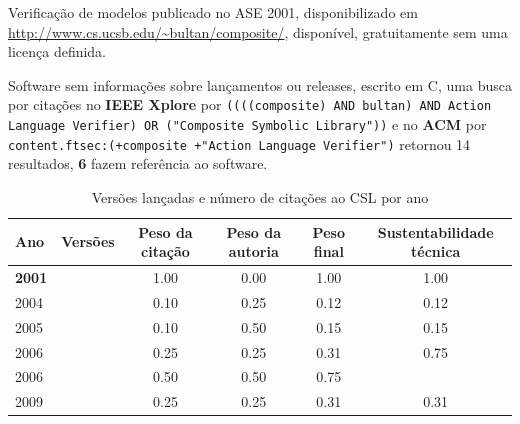 Verificação de modelos
publicado no ASE 2001,
disponibilizado em \url{http://www.cs.ucsb.edu/~bultan/composite/},
disponível,
gratuitamente
sem uma licença definida.

Software sem informações sobre lançamentos ou releases,
escrito em C,
uma busca por citações no {\bf IEEE Xplore} por
\texttt{((((composite) AND bultan) AND Action Language Verifier) OR ("Composite Symbolic Library"))}
e no {\bf ACM} por
\texttt{content.ftsec:(+composite +"Action Language Verifier")}
retornou
14 resultados,
{\bf 6} fazem referência ao software.


\begin{table}[H]
\caption{Versões lançadas e número de citações ao CSL por ano}
\centering
\begin{tabular}{| l | c | c | c | c | c |}
  \hline
  Ano & Versões & Peso da citação & Peso da autoria & Peso final & Sustentabilidade técnica \\
  \hline
            {\bf 2001}
          &
          
          &
          1.00
          &
          0.00
          &
          1.00
          &
            {\color{blue} 1.00}
          \\
\hline
            2004
          &
          
          &
          0.10
          &
          0.25
          &
          0.12
          &
            {\color{red} 0.12}
          \\
\hline
            2005
          &
          
          &
          0.10
          &
          0.50
          &
          0.15
          &
            {\color{red} 0.15}
          \\
\hline
            2006
          &
          
          &
          0.25
          &
          0.25
          &
          0.31
          &
            {\color{blue} 0.75}
          \\
            2006
          &
          
          &
          0.50
          &
          0.50
          &
          0.75
          &
          \\
\hline
            2009
          &
          
          &
          0.25
          &
          0.25
          &
          0.31
          &
            {\color{red} 0.31}
          \\
\hline
\end{tabular}
\end{table}


